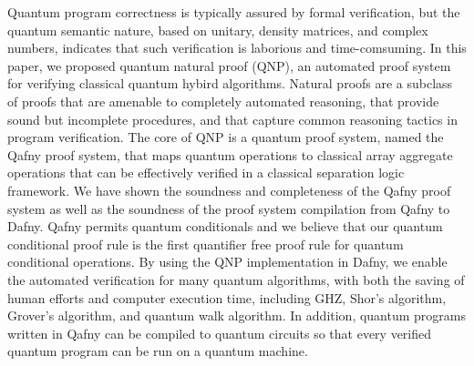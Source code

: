 Quantum program correctness is typically assured by formal verification, but the quantum semantic nature, based on unitary, density matrices, and complex numbers, indicates that such verification is laborious and time-comsuming. 
In this paper, we proposed quantum natural proof (QNP), an automated proof system for verifying classical quantum hybird algorithms. 
Natural proofs are a subclass of proofs that are amenable to completely automated reasoning, that provide sound but incomplete procedures, and that capture common reasoning tactics in program verification. 
The core of QNP is a quantum proof system, named the Qafny proof system, that maps quantum operations to classical array aggregate operations that can be effectively verified in a classical separation logic framework. We have shown the soundness and completeness of the Qafny proof system as well as the soundness of the proof system compilation from Qafny to Dafny.
Qafny permits quantum conditionals and we believe that our quantum conditional proof rule is the first quantifier free proof rule for quantum conditional operations.
By using the QNP implementation in Dafny, we enable the automated verification for many quantum algorithms, with both the saving of human efforts and computer execution time, including GHZ, Shor's algorithm, Grover's algorithm, and quantum walk algorithm.
In addition, quantum programs written in Qafny can be compiled to quantum circuits so that every verified quantum program can be run on a quantum machine. 
